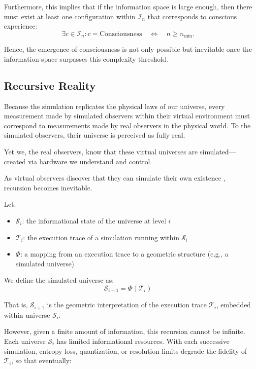 \documentclass[11pt]{article}
\begin{document}
Furthermore, this implies that if the information space is large enough, then there must exist at least one
configuration within $\mathcal{I}_n$ that corresponds to conscious experience:
\[
  \exists c \in \mathcal{I}_n : c = \text{Consciousness} \quad \iff \quad n \geq n_{\min}.
\]

Hence, the emergence of consciousness is not only possible but inevitable once the information 
space surpasses this complexity threshold.


\subsection{Recursive Reality}

Because the simulation replicates the physical laws of our universe, every measurement made by simulated observers 
within their virtual environment must correspond to measurements made by real observers in the physical world. 
To the simulated observers, their universe is perceived as fully real.

Yet we, the real observers, know that these virtual universes are simulated—created via hardware we understand and control.

As virtual observers discover that they can simulate their own existence \cite{bostrom2003}, recursion becomes inevitable.

Let:

\begin{itemize}
  \item \( \mathcal{S}_i \): the informational state of the universe at level \( i \)
  \item \( \mathcal{T}_i \): the execution trace of a simulation running within \( \mathcal{S}_i \)
  \item \( \Phi \): a mapping from an execution trace to a geometric structure (e.g., a simulated universe)
\end{itemize}

We define the simulated universe as:
\[
  \mathcal{S}_{i+1} = \Phi(\mathcal{T}_i)
\]

That is, \( \mathcal{S}_{i+1} \) is the geometric interpretation of the execution trace \( \mathcal{T}_i \), 
embedded within universe \( \mathcal{S}_i \).

However, given a finite amount of information, this recursion cannot be infinite. 
Each universe \( \mathcal{S}_i \) has limited informational resources. 
With each successive simulation, entropy loss, quantization, or resolution limits degrade the fidelity of \( \mathcal{T}_i \), 
so that eventually:
\end{document}
